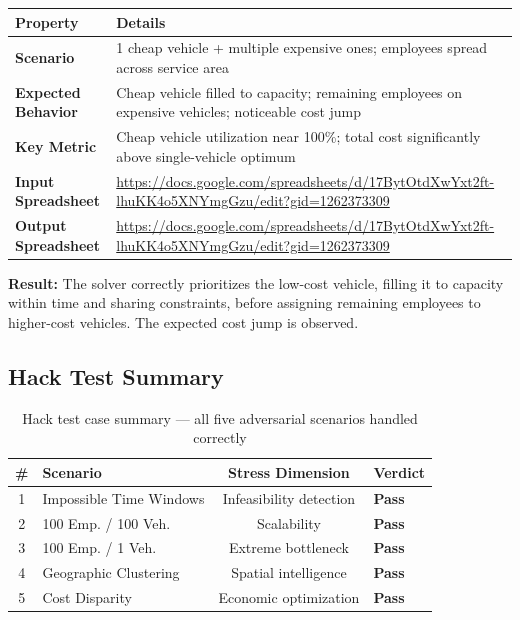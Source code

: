 \documentclass[11pt,a4paper]{article}
\begin{document}
\begin{table}[H]
\centering
\begin{tabular}{p{3.5cm}p{10cm}}
\toprule
\textbf{Property} & \textbf{Details} \\
\midrule
\rowcolor{rowalt}
\textbf{Scenario} & 1 cheap vehicle + multiple expensive ones; employees spread across service area \\
\textbf{Expected Behavior} & Cheap vehicle filled to capacity; remaining employees on expensive vehicles; noticeable cost jump \\
\rowcolor{rowalt}
\textbf{Key Metric} & Cheap vehicle utilization near 100\%; total cost significantly above single-vehicle optimum \\
\textbf{Input Spreadsheet} & \scriptsize\url{https://docs.google.com/spreadsheets/d/17BytOtdXwYxt2ft-lhuKK4o5XNYmgGzu/edit?gid=1262373309} \\
\rowcolor{rowalt}
\textbf{Output Spreadsheet} & \scriptsize\url{https://docs.google.com/spreadsheets/d/17BytOtdXwYxt2ft-lhuKK4o5XNYmgGzu/edit?gid=1262373309} \\
\bottomrule
\end{tabular}
\end{table}

\begin{resultbox}
\textbf{Result:} The solver correctly prioritizes the low-cost vehicle, filling it to capacity within time and sharing constraints, before assigning remaining employees to higher-cost vehicles. The expected cost jump is observed.
\end{resultbox}

\subsection{Hack Test Summary}

\begin{table}[H]
\centering
\caption{Hack test case summary --- all five adversarial scenarios handled correctly}
\label{tab:hack-summary}
\begin{tabular}{clcl}
\toprule
\textbf{\#} & \textbf{Scenario} & \textbf{Stress Dimension} & \textbf{Verdict} \\
\midrule
\rowcolor{rowalt}
1 & Impossible Time Windows & Infeasibility detection & \textcolor{velgreen}{\textbf{Pass}} \\
2 & 100 Emp. / 100 Veh. & Scalability & \textcolor{velgreen}{\textbf{Pass}} \\
\rowcolor{rowalt}
3 & 100 Emp. / 1 Veh. & Extreme bottleneck & \textcolor{velgreen}{\textbf{Pass}} \\
4 & Geographic Clustering & Spatial intelligence & \textcolor{velgreen}{\textbf{Pass}} \\
\rowcolor{rowalt}
5 & Cost Disparity & Economic optimization & \textcolor{velgreen}{\textbf{Pass}} \\
\bottomrule
\end{tabular}
\end{table}
\end{document}
